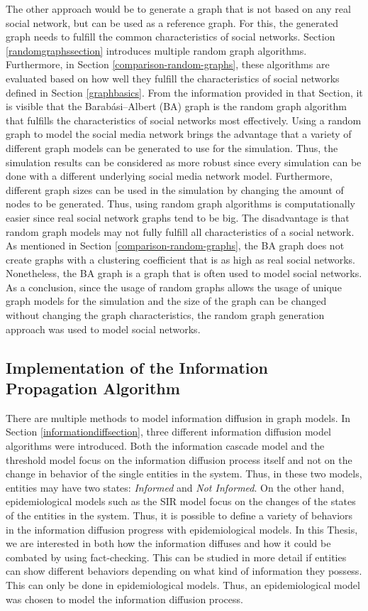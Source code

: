 The other approach would be to generate a graph that is not based
on any real social network, but can be used as a reference graph.
For this, the generated graph needs to fulfill the common
characteristics of social networks.
Section \ref{randomgraphssection} introduces multiple random graph algorithms.
Furthermore, in Section \ref{comparison-random-graphs},
these algorithms are evaluated based on how well they fulfill the characteristics
of social networks defined in Section \ref{graphbasics}. 
From the information provided in that Section, it is visible that the 
Barabási–Albert (BA) graph is the random graph algorithm that 
fulfills the characteristics of social networks most effectively. 
Using a random graph to model the social media network brings the advantage
that a variety of different graph models can be generated to use for 
the simulation. Thus, the simulation results can be considered as more 
robust since every simulation can be done with a different underlying 
social media network model. Furthermore, different graph sizes can be 
used in the simulation by changing the amount of nodes to be generated.
Thus, using random graph algorithms is computationally easier since 
real social network graphs tend to be big.
The disadvantage is that random graph models may not fully fulfill
all characteristics of a social network. As mentioned in 
Section \ref{comparison-random-graphs}, the BA graph
does not create graphs with a clustering coefficient that is as 
high as real social networks. Nonetheless, the BA  graph is
a graph that is often used to model social networks.
As a conclusion, since the usage of random graphs allows the usage
of unique graph models for the simulation and the size of the 
graph can be changed without changing the graph characteristics, 
the random graph generation approach was used to model social networks.

\subsection{Implementation of the Information Propagation Algorithm}
\label{modelinformationdiffusion}

There are multiple methods to model information diffusion in graph models.
In Section \ref{informationdiffsection}, three different information diffusion
model algorithms were introduced.
Both the information cascade model and the threshold model focus on the 
information diffusion process itself and not on the change in behavior
of the single entities in the system. Thus, in these two models,
entities may have two states: 
\textit{Informed} and \textit{Not Informed}.
On the other hand, epidemiological models such as the SIR model
focus on the changes of the states of the entities in the system.
Thus, it is possible to define a variety of behaviors in the
information diffusion progress with epidemiological models. 
In this Thesis, we are interested in both how the information
diffuses and how it could be combated by using fact-checking.
This can be studied in more detail if entities can 
show different behaviors depending on what kind of information
they possess. This can only be done in epidemiological models.
Thus, an epidemiological model was chosen to model the information 
diffusion process.

